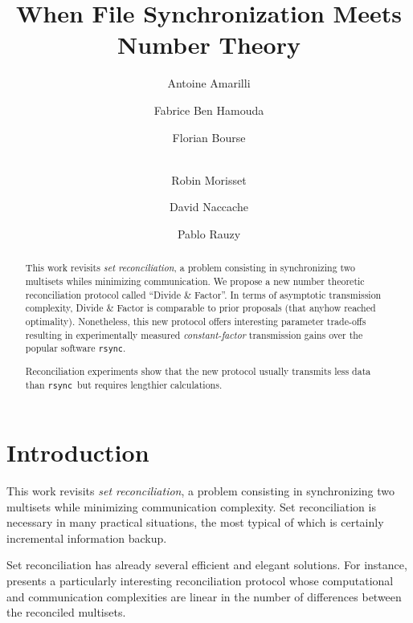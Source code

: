 \documentclass[11pt]{llncs}
\newcommand{\rsync}{\texttt{rsync}\xspace}
\begin{document}
\title{When File Synchronization Meets Number Theory}

\author{Antoine Amarilli \and Fabrice Ben Hamouda \and Florian Bourse \and\\
Robin Morisset \and David Naccache \and Pablo Rauzy}


\maketitle

\begin{abstract}
This work revisits {\sl set reconciliation}, a problem consisting in synchronizing two multisets whiles minimizing communication.
We propose a new number theoretic reconciliation protocol called ``Divide \& Factor''. In terms of asymptotic  transmission complexity, Divide \& Factor is comparable to prior proposals (that anyhow reached optimality). Nonetheless, this new protocol offers interesting parameter trade-offs resulting in experimentally measured {\sl constant-factor} transmission gains over the popular software \rsync.\smallskip

Reconciliation experiments show that the new protocol usually transmits less data than \rsync\ but requires lengthier calculations.\smallskip
\end{abstract}

\section{Introduction}

This work revisits {\sl set reconciliation}, a problem consisting in synchronizing two multisets while minimizing communication complexity. Set reconciliation is necessary in many practical situations, the most typical of which is certainly incremental information backup.\smallskip

Set reconciliation has already several efficient and elegant solutions. For instance, \cite{PSRec} presents a particularly interesting reconciliation protocol whose computational and communication complexities are linear in the number of differences between the reconciled multisets.\smallskip
\end{document}
